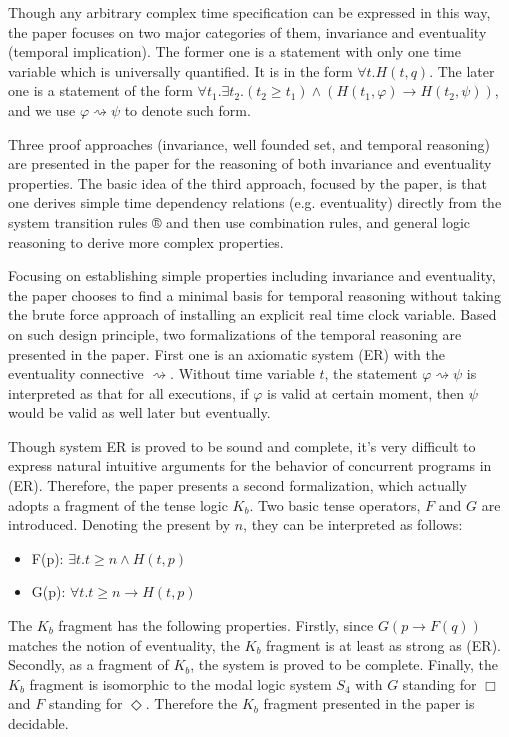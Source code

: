\documentclass{llncs}
\begin{document}
Though any arbitrary complex time specification can be expressed in this
way, the paper focuses on two major categories of them, invariance and
eventuality (temporal implication). The former one is a statement with
only one time variable which is universally quantified. It is in the form
 $\forall t. H(t, q)$.  The later one is a
statement of the form 
$\forall t_1. \exists t_2. (t_2 \geq t_1) \land (H(t_1, \varphi) \rightarrow
H(t_2,\psi))$, and we use $\varphi \rightsquigarrow \psi$ to denote such form.

Three proof approaches (invariance, well founded
set, and temporal reasoning) are presented in the paper for the reasoning of
both invariance and eventuality properties. The basic idea of the third 
approach, focused by the paper, is that one derives simple time dependency
relations (e.g. eventuality) directly from the system transition rules ®
and then use combination rules, and general logic reasoning to derive more
complex properties.

Focusing on establishing simple properties including invariance and
eventuality, the paper chooses to find a minimal basis for temporal reasoning
without taking the brute force approach of installing an explicit real time
clock variable. Based on such design principle, two formalizations of the
temporal reasoning are presented in the paper. First one is an axiomatic
system (ER) with the eventuality connective $\rightsquigarrow$. 
Without time variable $t$,
the statement $\varphi \rightsquigarrow \psi$ is interpreted as that for all executions,
if $\varphi$ is valid at certain moment, then $\psi$ would be valid as well
later but eventually.

Though system ER is proved to be sound and complete, it’s very difficult to
express natural intuitive arguments for the behavior of concurrent programs in
(ER). Therefore, the paper presents a second formalization, which actually
adopts a fragment of the tense logic $K_b$. Two basic tense operators, $F$ and
$G$ are introduced. Denoting the present by $n$, they can be interpreted as
follows:
\begin{itemize}
\item
F(p): $\exists t. t \geq n \land H(t,p)$

\item
G(p): $\forall t. t \geq n \rightarrow H(t,p)$

\end{itemize}

The $K_b$ fragment has the following properties. Firstly, since
$G(p \rightarrow F(q))$ matches the notion of eventuality, 
the $K_b$ fragment is at least
as strong as (ER). Secondly, as a fragment of $K_b$, the system is proved to be
complete. Finally, the $K_b$ fragment is isomorphic to the modal logic system
$S_4$ with $G$ standing for $\Box$ and $F$ standing for $\Diamond$. Therefore the $K_b$
fragment presented in the paper is decidable.
\end{document}
